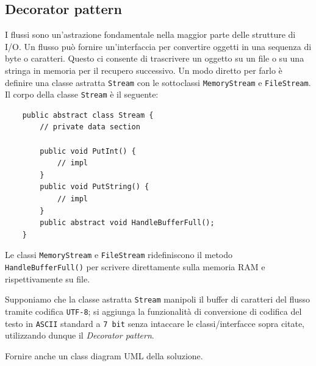 \documentclass[12pt,a4paper]{article}
\begin{document}
    \subsection{Decorator pattern}
    \begin{Exercise}[origin={Ispirato ad un esempio del libro GoF}]
        I flussi sono un'astrazione fondamentale nella maggior parte delle strutture di I/O. Un flusso può fornire un'interfaccia per convertire oggetti in una sequenza di byte o caratteri. Questo ci consente di trascrivere un oggetto su un file o su una stringa in memoria per il recupero successivo. Un modo diretto per farlo è definire una classe astratta \texttt{Stream} con le sottoclassi \texttt{MemoryStream} e \texttt{FileStream}.
        Il corpo della classe \texttt{Stream} è il seguente:
        \begin{lstlisting}
    public abstract class Stream {
        // private data section
        
        public void PutInt() {
            // impl
        }
        public void PutString() {
            // impl
        }
        public abstract void HandleBufferFull();
    }
        \end{lstlisting}
        
        
        Le classi \texttt{MemoryStream} e \texttt{FileStream} ridefiniscono il metodo \texttt{HandleBufferFull()} per scrivere direttamente sulla memoria RAM e rispettivamente su file.
        
        Supponiamo che la classe astratta \texttt{Stream} manipoli il buffer di caratteri del flusso tramite codifica \texttt{UTF-8}; si aggiunga la funzionalità di conversione di codifica del testo in \texttt{ASCII} standard a \texttt{7 bit} senza intaccare le classi/interfacce sopra citate, utilizzando dunque il \textit{Decorator pattern}.

        Fornire anche un class diagram UML della soluzione.
    \end{Exercise}

\end{document}
